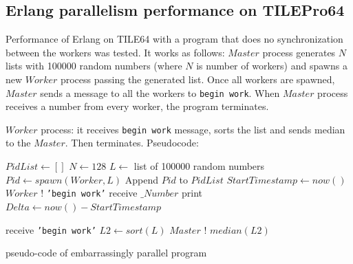 \documentclass[english,11pt]{l4proj}
\begin{document}
\subsection{Erlang parallelism performance on TILEPro64}

Performance of Erlang on TILE64 with a program that does no synchronization
between the workers was tested. It works as follows: $Master$ process generates
$N$ lists with 100000 random numbers (where $N$ is number of workers) and spawns
a new $Worker$ process passing the generated list. Once all workers are spawned,
$Master$ sends a message to all the workers to {\tt begin work}. When $Master$
process receives a number from every worker, the program terminates.

$Worker$ process: it receives {\tt begin work} message, sorts the list and
sends median to the $Master$. Then terminates. Pseudocode:

\begin{algorithm}
    \begin{algorithmic}
            \State $PidList \gets []$
            \State $N \gets 128$
                \State $L \gets$ list of 100000 random numbers
            \EndFor
            \State $Pid \gets spawn(Worker, L)$
            \State Append $Pid$ to $PidList$
            \State $StartTimestamp \gets now()$
                \State $Worker$ ! {\tt 'begin work'}
            \EndFor
                \State receive $\_Number$
            \EndFor
            \State print $Delta \gets now() - StartTimestamp$
        \EndFunction

            \State receive {\tt 'begin work'}
            \State $L2 \gets sort(L)$
            \State $Master$ ! $median(L2)$
        \EndFunction
    \end{algorithmic}
    \caption{pseudo-code of embarrassingly parallel program}
    \label{alg:embarrassing}
\end{algorithm}
\end{document}
